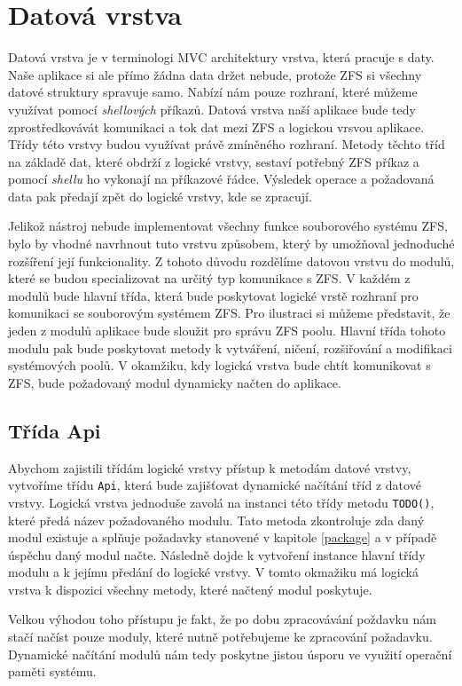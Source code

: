 \section{Datová vrstva}
Datová vrstva je v terminologi MVC architektury vrstva, která pracuje s daty. Naše aplikace si ale přímo žádna data držet nebude, protože ZFS si všechny datové struktury spravuje samo. Nabízí nám pouze rozhraní, které můžeme využívat pomocí \emph{shellových} příkazů. Datová vrstva naší aplikace bude tedy zprostředkovávát komunikaci a tok dat mezi ZFS a logickou vrsvou aplikace. Třídy této vrstvy budou využívat právě zmíněného rozhraní. Metody těchto tříd na základě dat, které obdrží z logické vrstvy, sestaví potřebný ZFS příkaz a pomocí \emph{shellu} ho vykonají na příkazové řádce. Výsledek operace a požadovaná data pak předají zpět do logické vrstvy, kde se zpracují.

Jelikož nástroj nebude implementovat všechny funkce souborového systému ZFS, bylo by vhodné navrhnout tuto vrstvu způsobem, který by umožňoval jednoduché rozšíření její funkcionality.
Z tohoto důvodu rozdělíme datovou vrstvu do modulů, které se budou specializovat na určitý typ komunikace s ZFS. V každém z modulů bude hlavní třída, která bude poskytovat logické vrstě rozhraní pro komunikaci se souborovým systémem ZFS. Pro ilustraci si můžeme představit, že jeden z modulů aplikace bude sloužit pro správu ZFS poolu. Hlavní třída tohoto modulu pak bude poskytovat metody k vytváření, ničení, rozšiřování a modifikaci systémových poolů. V okamžiku, kdy logická vrstva bude chtít komunikovat s ZFS, bude požadovaný modul dynamicky načten do aplikace.
    \subsection{Třída Api}
    Abychom zajistili třídám logické vrstvy přístup k metodám datové vrstvy, vytvoříme třídu \verb|Api|, která bude zajišťovat dynamické načítání tříd z datové vrstvy. Logická vrstva jednoduše zavolá na instanci této třídy metodu \verb|TODO()|, které předá název požadovaného modulu. Tato metoda zkontroluje zda daný modul existuje a splňuje požadavky stanovené v kapitole \ref{package} a v případě úspěchu daný modul načte. Následně dojde k vytvoření instance hlavní třídy modulu a k jejímu předání do logické vrstvy. V tomto okmažiku má logická vrstva k dispozici všechny metody, které načtený modul poskytuje.

    Velkou výhodou toho přístupu je fakt, že po dobu zpracovávání poždavku nám stačí načíst pouze moduly, které nutně potřebujeme ke zpracování požadavku. Dynamické načítání modulů nám tedy poskytne jistou úsporu ve využití operační paměti systému.    

